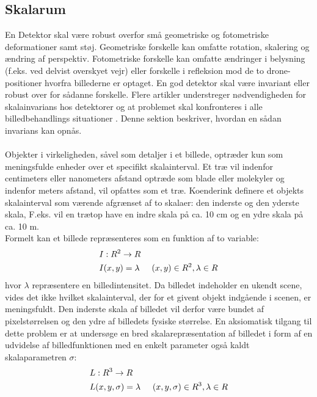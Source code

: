 \subsection{Skalarum}
En Detektor skal være robust overfor små geometriske og fotometriske deformationer samt støj. Geometriske forskelle kan omfatte rotation, skalering og ændring af perspektiv.  Fotometriske forskelle kan omfatte ændringer i belysning (f.eks. ved delvist overskyet vejr) eller forskelle i refleksion mod de to drone-positioner hvorfra billederne er optaget. En god detektor skal være invariant eller robust over for sådanne forskelle.  Flere artikler understreger nødvendigheden for skalainvarians hos detektorer og at problemet skal konfronteres i alle billedbehandlings situationer \cite{koen} \cite{blob} \cite{lindenscale}. Denne sektion beskriver, hvordan en sådan invarians kan opnås. \\ \\
Objekter i virkeligheden, såvel som detaljer i et billede, optræder kun som meningsfulde enheder over et specifikt skalainterval. Et træ vil indenfor centimeters eller nanometers afstand optræde som blade eller molekyler og indenfor meters afstand, vil opfattes som et træ. Koenderink \cite{koen} definere et objekts skalainterval som værende afgrænset af to skalaer: den inderste og den yderste skala,  F.eks. vil en trætop have en indre skala på ca. 10 cm og en ydre skala på ca. 10 m. 
\\
Formelt kan et billede repræsenteres som en funktion af to variable:
\begin{equation}
\begin{split}
&I: R^2 \rightarrow R \\
&I(x,y) = \lambda \hspace{0.5 cm} (x,y)\in R^2, \lambda \in R
\end{split}
\end{equation}
hvor $\lambda$ repræsentere en billedintensitet. Da billedet indeholder en ukendt scene, vides det ikke hvilket skalainterval, der for et givent objekt indgående i scenen, er meningsfuldt. Den inderste skala af billedet vil derfor være bundet af pixelstørrelsen og den ydre af billedets fysiske størrelse. En aksiomatisk tilgang til dette problem er at undersøge en bred skalarepræsentation af billedet i form af en udvidelse af billedfunktionen med en enkelt parameter også kaldt skalaparametren $\sigma$:
\begin{equation}
\begin{split}
&L: R^3 \rightarrow R \\
&L(x,y,\sigma) = \lambda \hspace{0.5 cm} (x,y,\sigma)\in R^3, \lambda \in R
\end{split}
\end{equation}
